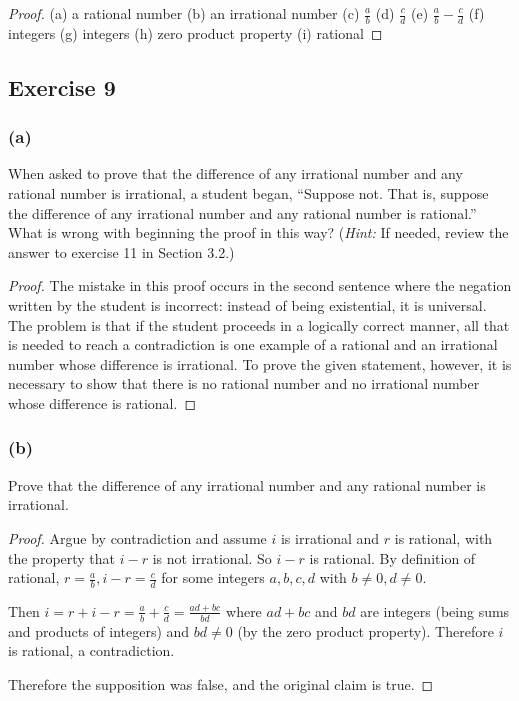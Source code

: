\documentclass[14pt]{extarticle}
\begin{document}
\begin{proof}
(a) a rational number
(b) an irrational number
(c) $\frac{a}{b}$
(d) $\frac{c}{d}$
(e) $\frac{a}{b} - \frac{c}{d}$
(f) integers
(g) integers
(h) zero product property
(i) rational
\end{proof}

\subsection{Exercise 9}

\subsubsection{(a)}
When asked to prove that the difference of any irrational number and any rational number is irrational, a student began, “Suppose not. That is, suppose the difference of any irrational number and any rational number is rational.” What is wrong with beginning the proof in this way? ({\it Hint:} If needed, review the answer to exercise 11 in Section 3.2.)

\begin{proof}
The mistake in this proof occurs in the second sentence where the negation written by the student is incorrect: instead of being existential, it is universal. The problem is that if the student proceeds in a logically correct manner, all that is needed to reach a contradiction is one example of a rational and an irrational number whose difference is irrational. To prove the given statement, however, it is necessary to show that there is no rational
number and no irrational number whose difference is rational.
\end{proof}

\subsubsection{(b)}
Prove that the difference of any irrational number and any rational number is irrational.

\begin{proof}
Argue by contradiction and assume $i$ is irrational and $r$ is rational, with the property that $i-r$ is not irrational. So $i-r$ is rational. By definition of rational, $r = \frac{a}{b}, i-r = \frac{c}{d}$ for some integers $a,b,c,d$ with $b \neq 0, d \neq 0$.

Then $i = r + i - r = \frac{a}{b} + \frac{c}{d} = \frac{ad+bc}{bd}$ where $ad+bc$ and $bd$ are integers (being sums and products of integers) and $bd \neq 0$ (by the zero product property). Therefore $i$ is rational, a contradiction.

Therefore the supposition was false, and the original claim is true.
\end{proof}
\end{document}

